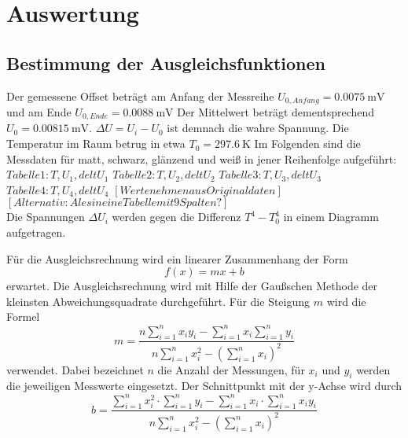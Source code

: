 \section{Auswertung}
\label{sec:Auswertung}

\subsection{Bestimmung der Ausgleichsfunktionen}
Der gemessene Offset beträgt am Anfang der Messreihe $U_{0,Anfang} = \SI{0,0075}{\milli\volt}$ und am Ende $U_{0,Ende} = \SI{0,0088}{\milli\volt}$
Der Mittelwert beträgt dementsprechend $U_0 = \SI{0.00815}{\milli\volt}$.
$\Delta U = U_i - U_0$ ist demnach die wahre Spannung.
Die Temperatur im Raum betrug in etwa $T_0 = \SI{297,6}{\kelvin}$
Im Folgenden sind die Messdaten für matt, schwarz, glänzend und weiß in jener Reihenfolge aufgeführt:
\\
$Tabelle 1: T, U_1, delt U_1$
$Tabelle 2: T, U_2, delt U_2$
$Tabelle 3: T, U_3, delt U_3$
$Tabelle 4: T, U_4, delt U_4$
$[Werte nehmen aus Originaldaten]$
$[Alternativ: Ales in eine Tabelle mit 9 Spalten?]$
\\
Die Spannungen $\Delta U_i$ werden gegen die Differenz $T^4 - T_0^4$ in einem Diagramm aufgetragen.


Für die Ausgleichsrechnung wird ein linearer Zusammenhang der Form
\begin{equation}
  f(x) = mx + b
\end{equation}
erwartet.
Die Ausgleichsrechnung wird mit Hilfe der Gaußschen Methode der kleinsten Abweichungsquadrate durchgeführt.
Für die Steigung $m$ wird die Formel
\begin{equation}
  m = \frac{ n \sum_{i=1}^n x_i y_i - \sum_{i=1}^n x_i \sum_{i=1}^n y_i }{n\sum_{i=1}^n x_i^2 - ( \sum_{i=1}^n x_i )^2}
\end{equation}
verwendet. Dabei bezeichnet $n$ die Anzahl der Messungen, für $x_i$ und $y_i$ werden die jeweiligen Messwerte eingesetzt. Der Schnittpunkt mit der y-Achse wird durch
\begin{equation}
  b = \frac{ \sum_{i=1}^n x_i^2 \cdot \sum_{i=1}^n y_i - \sum_{i=1}^n x_i \cdot \sum_{i=1}^n x_i y_i}{n\sum_{i=1}^n x_i^2 - ( \sum_{i=1}^n x_i )^2}
\end{equation}

